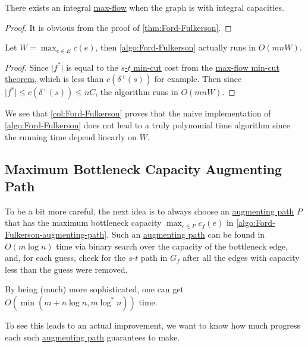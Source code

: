 \begin{corollary}
	There exists an integral \hyperref[prb:s-t-max-flow]{max-flow} when the graph is with integral capacities.
\end{corollary}
\begin{proof}
	It is obvious from the proof of \autoref{thm:Ford-Fulkerson}.
\end{proof}

\begin{corollary}\label{col:Ford-Fulkerson}
	Let \(W = \max _{e \in E} c(e)\), then \autoref{algo:Ford-Fulkerson} actually runs in \(O(mn W)\).
\end{corollary}
\begin{proof}
	Since \(\lvert f^{\ast} \rvert \) is equal to the \hyperref[prb:s-t-min-cut]{\(s\)-\(t\) min-cut} cost from the \hyperref[thm:max-flow-min-cut]{max-flow min-cut theorem}, which is less than \(c(\delta ^+(s))\) for example. Then since \(\lvert f^{\ast} \rvert \leq  c(\delta ^+(s)) \leq n C\), the algorithm runs in \(O(mn W)\).
\end{proof}

We see that \autoref{col:Ford-Fulkerson} proves that the naive implementation of \autoref{algo:Ford-Fulkerson} does not lead to a truly polynomial time algorithm since the running time depend linearly on \(W\).

\subsection{Maximum Bottleneck Capacity Augmenting Path}
To be a bit more careful, the next idea is to always choose an \hyperref[def:augmenting-path]{augmenting path} \(P\) that has the maximum bottleneck capacity \(\max _{e \in P} c_f(e)\) in \autoref{algo:Ford-Fulkerson-augmenting-path}. Such an \hyperref[def:augmenting-path]{augmenting path} can be found in \(O(m \log n)\) time via binary search over the capacity of the bottleneck edge, and, for each guess, check for the \(s\)-\(t\) path in \(G_f\) after all the edges with capacity less than the guess were removed.

\begin{note}
	By being (much) more sophisticated, one can get \(O(\min (m + n \log n, m \log ^{\ast} n))\) time.
\end{note}

To see this leads to an actual improvement, we want to know how much progress each such \hyperref[def:augmenting-path]{augmenting path} guarantees to make.

